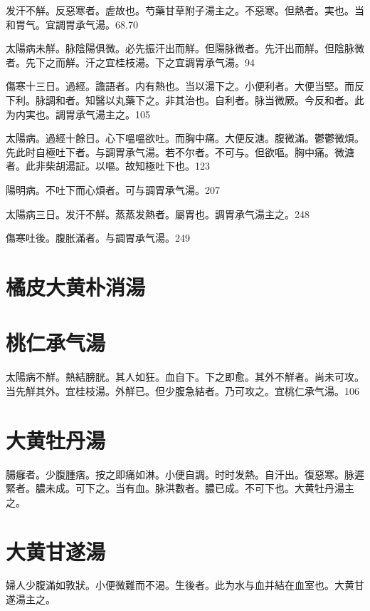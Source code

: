 \documentclass[12pt,twoside,UTF8,b5paper]{ctexbook}
\begin{document}
发汗不觧。反惡寒者。虗故也。芍藥甘草附子湯主之。不惡寒。但熱者。実也。当和胃气。宜調胃承气湯。68.70

太陽病未觧。脉陰陽俱微。必先振汗出而觧。但陽{脉}微者。先汗出而觧。但陰{脉}微者。先下之而觧。汗之宜桂枝湯。下之宜{調胃}承气湯。94

傷寒十三日。過經。譫語者。内有熱也。当以湯下之。小便利者。大便当堅。而反{下}利。脉調和者。知醫以丸藥下之。非其治也。自利者。脉当微厥。今反和者。此为内実也。{調胃}承气湯主之。105

太陽病。過經十餘日。心下嗢嗢欲吐。而胸中痛。大便反溏。腹微滿。鬱鬱微煩。先{此}时自極吐下者。与{調胃}承气湯。若不尔者。不可与。但欲嘔。胸中痛。微溏者。此非柴胡湯証。以嘔。故知極吐下也。123

陽明病。不吐下而{心}煩者。可与{調胃}承气湯。207

太陽病三日。发汗不觧。蒸蒸发熱者。屬胃也。{調胃}承气湯主之。248

傷寒吐後。腹胀滿者。与{調胃}承气湯。249

\section{橘皮大黄朴消湯}

\section{桃仁承气湯}

太陽病不觧。熱結膀胱。其人如狂。血自下。下之即愈。其外不觧者。尚未可攻。当先觧其外。{宜桂枝湯。}外觧已。{但}少腹急結者。乃可攻之。宜桃仁承气湯。106

\section{大黄牡丹湯}

腸癰者。少腹腫痞。按之即痛如淋。小便自調。时时发熱。自汗出。復惡寒。脉遲緊者。膿未成。可下之。当有血。脉洪數者。膿已成。不可下也。大黄牡丹湯主之。

\section{大黄甘遂湯}

婦人少腹滿如敦狀。小便微難而不渴。生後者。此为水与血并結在血室也。大黄甘遂湯主之。
\end{document}
